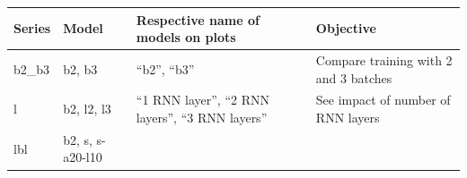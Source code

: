 \begin{longtable}[]{@{}llll@{}}
\toprule
\begin{minipage}[b]{0.04\columnwidth}\raggedright\strut
Series\strut
\end{minipage} & \begin{minipage}[b]{0.08\columnwidth}\raggedright\strut
Model\strut
\end{minipage} & \begin{minipage}[b]{0.30\columnwidth}\raggedright\strut
Respective name of models on plots\strut
\end{minipage} & \begin{minipage}[b]{0.46\columnwidth}\raggedright\strut
Objective\strut
\end{minipage}\tabularnewline
\midrule
\endhead
\begin{minipage}[t]{0.04\columnwidth}\raggedright\strut
b2\_b3\strut
\end{minipage} & \begin{minipage}[t]{0.08\columnwidth}\raggedright\strut
b2, b3\strut
\end{minipage} & \begin{minipage}[t]{0.30\columnwidth}\raggedright\strut
``b2'', ``b3''\strut
\end{minipage} & \begin{minipage}[t]{0.46\columnwidth}\raggedright\strut
Compare training with 2 and 3 batches\strut
\end{minipage}\tabularnewline
\begin{minipage}[t]{0.04\columnwidth}\raggedright\strut
l\strut
\end{minipage} & \begin{minipage}[t]{0.08\columnwidth}\raggedright\strut
b2, l2, l3\strut
\end{minipage} & \begin{minipage}[t]{0.30\columnwidth}\raggedright\strut
``1 RNN layer'', ``2 RNN layers'', ``3 RNN layers''\strut
\end{minipage} & \begin{minipage}[t]{0.46\columnwidth}\raggedright\strut
See impact of number of RNN layers\strut
\end{minipage}\tabularnewline
\begin{minipage}[t]{0.04\columnwidth}\raggedright\strut
lbl\strut
\end{minipage} & \begin{minipage}[t]{0.08\columnwidth}\raggedright\strut
b2, s, s-a20-l10\strut
\end{minipage} & \begin{minipage}[t]{0.30\columnwidth}\raggedright\strut

\end{minipage}
\end{longtable}
